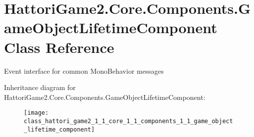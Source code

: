 \hypertarget{class_hattori_game2_1_1_core_1_1_components_1_1_game_object_lifetime_component}{}\section{Hattori\+Game2.\+Core.\+Components.\+Game\+Object\+Lifetime\+Component Class Reference}
\label{class_hattori_game2_1_1_core_1_1_components_1_1_game_object_lifetime_component}


Event interface for common Mono\+Behavior messages  


Inheritance diagram for Hattori\+Game2.\+Core.\+Components.\+Game\+Object\+Lifetime\+Component\+:\begin{figure}[H]
\begin{center}
\leavevmode
\texttt{[image: class\_hattori\_game2\_1\_1\_core\_1\_1\_components\_1\_1\_game\_object\_lifetime\_component]}
\end{center}
\end{figure}
